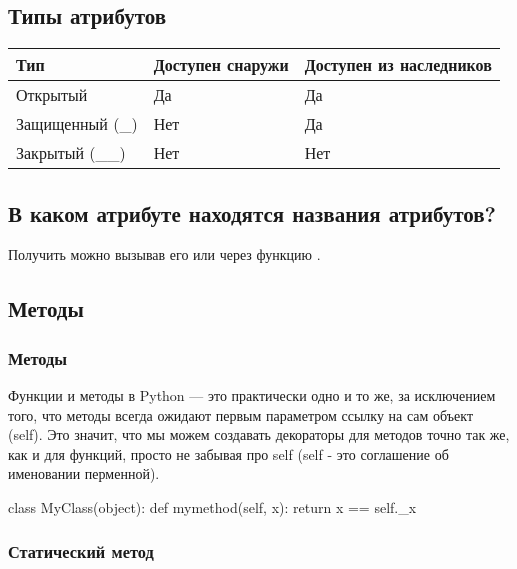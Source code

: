 \subsection{Типы атрибутов}

\begin{table}[h!]
\begin{tabular}{|l|l|l|}
\hline
Тип             & Доступен снаружи & Доступен из наследников \\ \hline
Открытый        & Да               & Да                      \\ \hline
Защищенный (\_) & Нет              & Да                      \\ \hline
Закрытый (\_\_) & Нет              & Нет                     \\ \hline
\end{tabular}
\end{table}

\subsection{В каком атрибуте находятся названия атрибутов?}

Получить  можно вызывав его  или через функцию .

\subsection{Методы}

\subsubsection{Методы}

Функции и методы в Python — это практически одно и то же, за исключением того, что методы всегда ожидают первым параметром ссылку на сам объект (self). Это значит, что мы можем создавать декораторы для методов точно так же, как и для функций, просто не забывая про self (self - это соглашение об именовании перменной).

\begin{python}
class MyClass(object):
    def mymethod(self, x):
        return x == self._x
\end{python}

\subsubsection{Статический метод}

